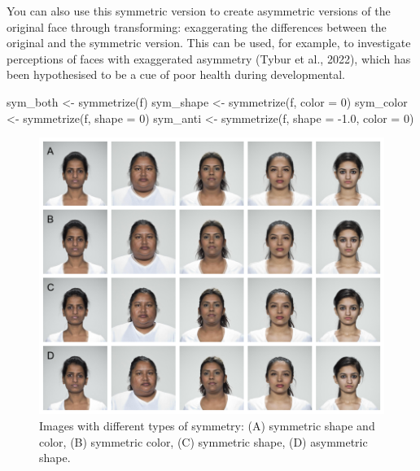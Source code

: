 \documentclass[
  man,floatsintext]{apa6}
\newenvironment{Shaded}{\begin{snugshade}}{\end{snugshade}}
\newcommand{\AttributeTok}[1]{\textcolor[rgb]{0.77,0.63,0.00}{#1}}
\newcommand{\DecValTok}[1]{\textcolor[rgb]{0.00,0.00,0.81}{#1}}
\newcommand{\FloatTok}[1]{\textcolor[rgb]{0.00,0.00,0.81}{#1}}
\newcommand{\FunctionTok}[1]{\textcolor[rgb]{0.00,0.00,0.00}{#1}}
\newcommand{\NormalTok}[1]{#1}
\newcommand{\OtherTok}[1]{\textcolor[rgb]{0.56,0.35,0.01}{#1}}
\newcommand{\SpecialCharTok}[1]{\textcolor[rgb]{0.00,0.00,0.00}{#1}}
\begin{document}
You can also use this symmetric version to create asymmetric versions of the original face through transforming: exaggerating the differences between the original and the symmetric version. This can be used, for example, to investigate perceptions of faces with exaggerated asymmetry (Tybur et al., 2022), which has been hypothesised to be a cue of poor health during developmental.

\begin{Shaded}
\begin{Highlighting}[]
\NormalTok{sym\_both }\OtherTok{\textless{}{-}} \FunctionTok{symmetrize}\NormalTok{(f)}
\NormalTok{sym\_shape }\OtherTok{\textless{}{-}} \FunctionTok{symmetrize}\NormalTok{(f, }\AttributeTok{color =} \DecValTok{0}\NormalTok{)}
\NormalTok{sym\_color }\OtherTok{\textless{}{-}} \FunctionTok{symmetrize}\NormalTok{(f, }\AttributeTok{shape =} \DecValTok{0}\NormalTok{)}
\NormalTok{sym\_anti }\OtherTok{\textless{}{-}} \FunctionTok{symmetrize}\NormalTok{(f, }\AttributeTok{shape =} \SpecialCharTok{{-}}\FloatTok{1.0}\NormalTok{, }\AttributeTok{color =} \DecValTok{0}\NormalTok{)}
\end{Highlighting}
\end{Shaded}

\begin{figure}
\includegraphics[width=1\linewidth]{index_files/figure-latex/morph-sym-1} \caption{Images with different types of symmetry: (A) symmetric shape and color, (B) symmetric color, (C) symmetric shape, (D) asymmetric shape.}\label{fig:morph-sym}
\end{figure}
\end{document}
